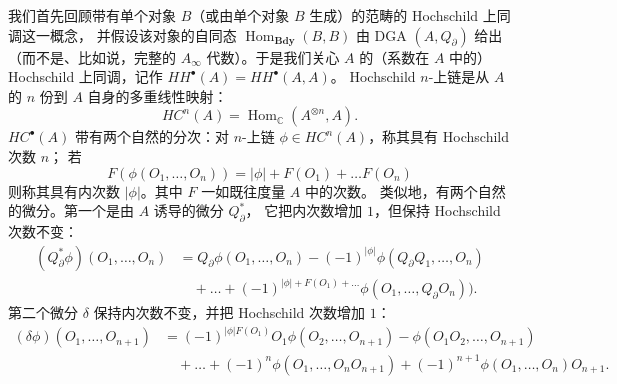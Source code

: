我们首先回顾带有单个对象 $B$（或由单个对象 $B$ 生成）的范畴的 Hochschild 上同调这一概念，
并假设该对象的自同态 $\operatorname{Hom}_{\mathbf{Bdy}}(B,B)$ 由 DGA $(A,Q_\partial)$ 给出
（而不是、比如说，完整的 $A_\infty$ 代数）。于是我们关心 $A$ 的（系数在 $A$ 中的）
Hochschild 上同调，记作 $HH^\bullet(A) = HH^\bullet(A,A)$。
Hochschild $n$-上链是从 $A$ 的 $n$ 份到 $A$ 自身的多重线性映射：
\begin{equation}\tag{3.34}
HC^n(A) = \operatorname{Hom}_{\mathbb{C}}(A^{\otimes n}, A) .
\end{equation}
$HC^\bullet(A)$ 带有两个自然的分次：对 $n$-上链 $\phi\in HC^n(A)$，称其具有 Hochschild 次数 $n$；
若
\begin{equation}\tag{3.35}
F(\phi(O_1,\dots,O_n)) = |\phi| + F(O_1) + \dots F(O_n)
\end{equation}
则称其具有内次数 $|\phi|$。其中 $F$ 一如既往度量 $A$ 中的次数。
类似地，有两个自然的微分。第一个是由 $A$ 诱导的微分 $Q^*_\partial$，
它把内次数增加 $1$，但保持 Hochschild 次数不变：
\begin{equation}\tag{3.36}
\begin{aligned}
(Q^*_\partial\phi)(O_1,\dots,O_n) &= Q_\partial\phi(O_1,\dots,O_n) - (-1)^{|\phi|}\phi(Q_\partial Q_1,\dots,O_n) \\
&\quad + \dots + (-1)^{|\phi|+F(O_1)+\dots}\phi(O_1,\dots,Q_\partial O_n)) .
\end{aligned}
\end{equation}
第二个微分 $\delta$ 保持内次数不变，并把 Hochschild 次数增加 $1$：
\begin{equation}\tag{3.37}
\begin{aligned}
(\delta\phi)(O_1,\dots,O_{n+1}) &= (-1)^{|\phi|F(O_1)}O_1\phi(O_2,\dots,O_{n+1}) - \phi(O_1O_2,\dots,O_{n+1}) \\
&\quad + \dots + (-1)^n\phi(O_1,\dots,O_nO_{n+1}) + (-1)^{n+1}\phi(O_1,\dots,O_n)O_{n+1} .
\end{aligned}
\end{equation}

